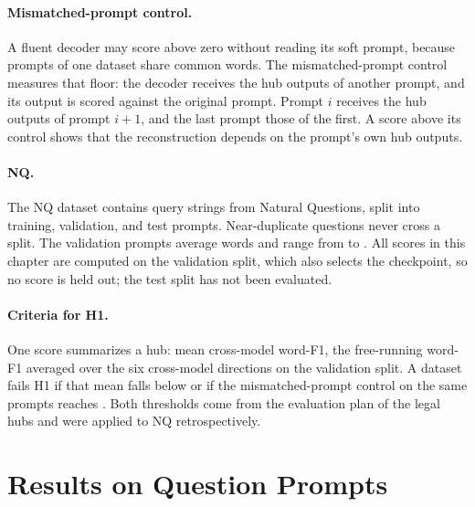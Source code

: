 \paragraph{Mismatched-prompt control.} A fluent decoder may score above zero without reading its soft prompt, because prompts of one dataset share common words.
The mismatched-prompt control measures that floor: the decoder receives the hub outputs of another prompt, and its output is scored against the original prompt.
Prompt $i$ receives the hub outputs of prompt $i+1$, and the last prompt those of the first. %
A score above its control shows that the reconstruction depends on the prompt's own hub outputs.

\paragraph{NQ.} The NQ dataset contains query strings from Natural Questions, split into  training,  validation, and  test prompts.
Near-duplicate questions never cross a split. %
The validation prompts average  words and range from  to . %
All scores in this chapter are computed on the validation split, which also selects the checkpoint, so no score is held out; the test split has not been evaluated.

\paragraph{Criteria for H1.} One score summarizes a hub: mean cross-model word-F1, the free-running word-F1 averaged over the six cross-model directions on the validation split.
A dataset fails H1 if that mean falls below  or if the mismatched-prompt control on the same prompts reaches .
Both thresholds come from the evaluation plan of the legal hubs and were applied to NQ retrospectively. %

\section{Results on Question Prompts}\label{sec:hub:results}\label{sec:hub:translation}

